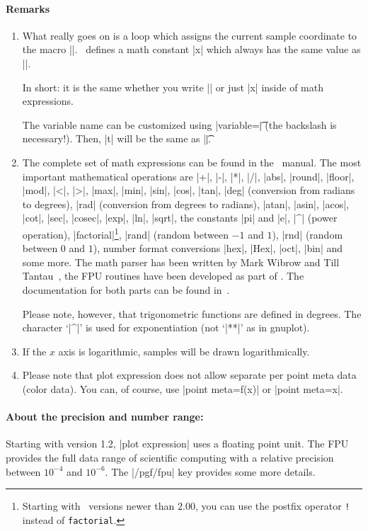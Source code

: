 {\begin{addplotoperation}[]{}{}
\paragraph{Remarks}
\begin{enumerate} 
	\item What really goes on is a loop which assigns the current sample coordinate to the macro |\x|. \PGFPlots\ defines a math constant |x| which always has the same value as |\x|.

	In short: it is the same whether you write |\x| or just |x| inside of math expressions.

	The variable name can be customized using |variable=\t| (the backslash is necessary!). Then, |t| will be the same as |\t|.
%

	\item The complete set of math expressions can be found in the \PGF\ manual. The most important mathematical operations are
	|+|, |-|, |*|, |/|, |abs|, |round|, |floor|, |mod|, |<|, |>|, |max|, |min|, |sin|, |cos|, |tan|, |deg| (conversion from radians to degrees), |rad| (conversion from degrees to radians), |atan|, |asin|, |acos|, |cot|, |sec|, |cosec|, |exp|, |ln|, |sqrt|, the constants |pi| and |e|, |^| (power operation), |factorial|\footnote{Starting with \PGF\ versions newer than $2.00$, you can use the postfix operator \texttt{!} instead of \texttt{factorial}.}, |rand| (random between $-1$ and $1$), |rnd| (random between $0$ and $1$), number format conversions |hex|, |Hex|, |oct|, |bin| and some more. The math parser has been written by Mark Wibrow and Till Tantau~\cite{tikz}, the FPU routines have been developed as part of \PGFPlots. The documentation for both parts can be found in~\cite{tikz}.
	
	Please note, however, that trigonometric functions are defined in degrees. The character `|^|' is used for exponentiation (not `|**|' as in gnuplot).

	\item If the $x$ axis is logarithmic, samples will be drawn logarithmically.

	\item Please note that plot expression does not allow separate per point meta data (color data). You can, of course, use |point meta=f(x)| or |point meta=x|.
\end{enumerate}

\paragraph{About the precision and number range:}
%
%
	 Starting with version 1.2, |plot expression| uses a floating point unit. The FPU provides the full data range of scientific computing with a relative precision between $10^{-4}$ and $10^{-6}$. The |/pgf/fpu| key provides some more details. 


\end{addplotoperation}}
